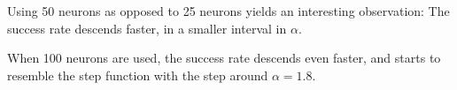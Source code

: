 Using 50 neurons as opposed to 25 neurons yields an interesting observation:
The success rate descends faster, in a smaller interval in \(\alpha\).

When 100 neurons are used, the success rate descends even faster, and starts to resemble the step function with the step around \(\alpha = 1.8\).
